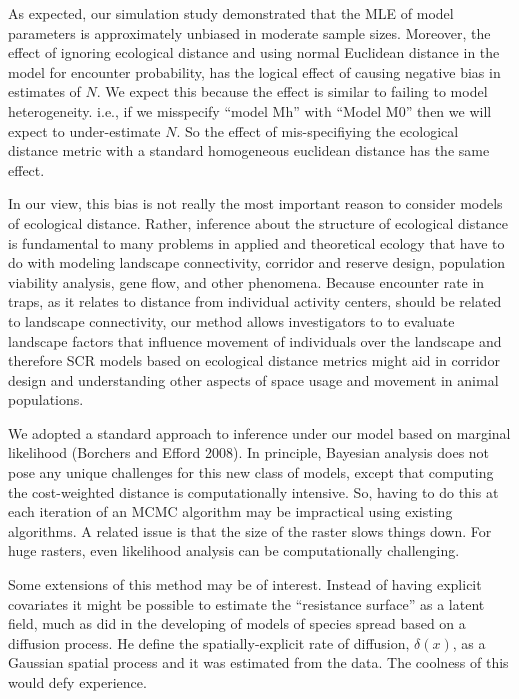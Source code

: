 As expected, our simulation study demonstrated that the MLE of model
parameters is approximately unbiased in moderate sample
sizes. Moreover, the 
effect of ignoring ecological distance and using normal Euclidean
distance in the model for encounter probability, has the 
logical effect of causing negative bias
in estimates of $N$. We expect this because the effect is similar to
failing to model heterogeneity. i.e., if we misspecify ``model Mh'' with
``Model M0'' then we will expect to under-estimate $N$. So the effect of
mis-specifiying the ecological distance metric with a standard
homogeneous euclidean distance has the same effect.

In our view, this bias is not really the most important reason to consider models of
ecological distance. Rather, inference about the structure of
ecological distance is fundamental to many problems in applied and
theoretical ecology that have to do with modeling landscape
connectivity, corridor and reserve design, population viability
analysis, gene flow, and other phenomena. 
Because encounter rate in traps, as it relates to distance from
individual activity centers, should be related to landscape
connectivity, our method allows investigators to to evaluate landscape
factors that influence movement of individuals over the landscape and
therefore SCR models based on ecological distance metrics might aid in
corridor design and understanding other aspects of space usage and
movement in animal populations. 

We adopted a standard approach to inference under our model based on
marginal likelihood (Borchers and Efford 2008). In principle, 
Bayesian analysis does not pose any unique challenges for this new
class of models, except that computing the cost-weighted distance is
computationally intensive. 
 So, having to do this at each iteration of an
MCMC algorithm may be impractical using existing algorithms.
A related issue is that the size of the raster slows things down. For
huge rasters, even likelihood analysis can be computationally challenging.

Some extensions of this method may be of interest. Instead of 
having explicit covariates it might be possible to estimate the 
``resistance surface'' as a latent field, much as \citep{wikle:2003}
 did in the developing of models of species spread based on a
 diffusion process. He define the spatially-explicit rate of 
diffusion, $\delta(x)$, as a Gaussian spatial process and it was
estimated from the data.  The coolness of this would defy experience. 
















